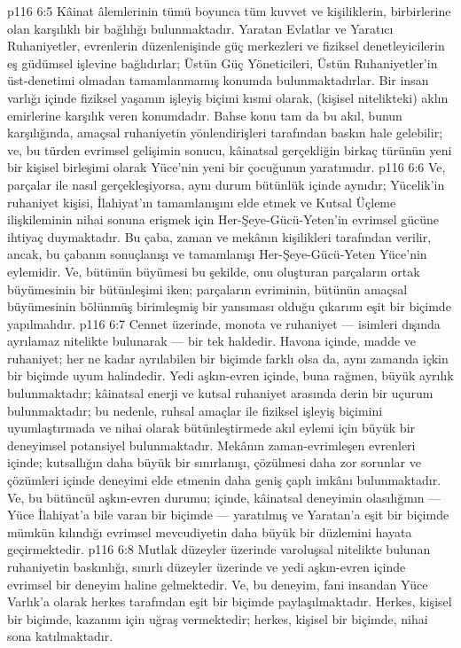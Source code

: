 \vs p116 6:5 Kâinat âlemlerinin tümü boyunca tüm kuvvet ve kişiliklerin, birbirlerine olan karşılıklı bir bağlılığı bulunmaktadır. Yaratan Evlatlar ve Yaratıcı Ruhaniyetler, evrenlerin düzenlenişinde güç merkezleri ve fiziksel denetleyicilerin eş güdümsel işlevine bağlıdırlar; Üstün Güç Yöneticileri, Üstün Ruhaniyetler’in üst\hyp{}denetimi olmadan tamamlanmamış konumda bulunmaktadırlar. Bir insan varlığı içinde fiziksel yaşamın işleyiş biçimi kısmi olarak, (kişisel nitelikteki) aklın emirlerine karşılık veren konumdadır. Bahse konu tam da bu akıl, bunun karşılığında, amaçsal ruhaniyetin yönlendirişleri tarafından baskın hale gelebilir; ve, bu türden evrimsel gelişimin sonucu, kâinatsal gerçekliğin birkaç türünün yeni bir kişisel birleşimi olarak Yüce’nin yeni bir çocuğunun yaratımıdır.
\vs p116 6:6 Ve, parçalar ile nasıl gerçekleşiyorsa, aynı durum bütünlük içinde aynıdır; Yücelik’in ruhaniyet kişisi, İlahiyat’ın tamamlanışını elde etmek ve Kutsal Üçleme ilişkileminin nihai sonuna erişmek için Her\hyp{}Şeye\hyp{}Gücü\hyp{}Yeten’in evrimsel gücüne ihtiyaç duymaktadır. Bu çaba, zaman ve mekânın kişilikleri tarafından verilir, ancak, bu çabanın sonuçlanışı ve tamamlanışı Her\hyp{}Şeye\hyp{}Gücü\hyp{}Yeten Yüce’nin eylemidir. Ve, bütünün büyümesi bu şekilde, onu oluşturan parçaların ortak büyümesinin bir bütünleşimi iken; parçaların evriminin, bütünün amaçsal büyümesinin bölünmüş birimleşmiş bir yansıması olduğu çıkarımı eşit bir biçimde yapılmalıdır.
\vs p116 6:7 Cennet üzerinde, monota ve ruhaniyet --- isimleri dışında ayrılamaz nitelikte bulunarak --- bir tek haldedir. Havona içinde, madde ve ruhaniyet; her ne kadar ayrılabilen bir biçimde farklı olsa da, aynı zamanda içkin bir biçimde uyum halindedir. Yedi aşkın\hyp{}evren içinde, buna rağmen, büyük ayrılık bulunmaktadır; kâinatsal enerji ve kutsal ruhaniyet arasında derin bir uçurum bulunmaktadır; bu nedenle, ruhsal amaçlar ile fiziksel işleyiş biçimini uyumlaştırmada ve nihai olarak bütünleştirmede akıl eylemi için büyük bir deneyimsel potansiyel bulunmaktadır. Mekânın zaman\hyp{}evrimleşen evrenleri içinde; kutsallığın daha büyük bir sınırlanışı, çözülmesi daha zor sorunlar ve çözümleri içinde deneyimi elde etmenin daha geniş çaplı imkânı bulunmaktadır. Ve, bu bütüncül aşkın\hyp{}evren durumu; içinde, kâinatsal deneyimin olasılığının --- Yüce İlahiyat’a bile varan bir biçimde --- yaratılmış ve Yaratan’a eşit bir biçimde mümkün kılındığı evrimsel mevcudiyetin daha büyük bir düzlemini hayata geçirmektedir.
\vs p116 6:8 Mutlak düzeyler üzerinde varoluşsal nitelikte bulunan ruhaniyetin baskınlığı, sınırlı düzeyler üzerinde ve yedi aşkın\hyp{}evren içinde evrimsel bir deneyim haline gelmektedir. Ve, bu deneyim, fani insandan Yüce Varlık’a olarak herkes tarafından eşit bir biçimde paylaşılmaktadır. Herkes, kişisel bir biçimde, kazanım için uğraş vermektedir; herkes, kişisel bir biçimde, nihai sona katılmaktadır.

